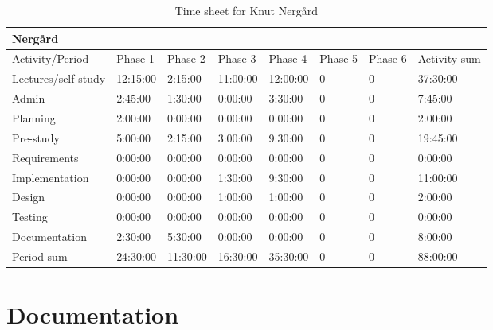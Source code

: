\documentclass[11pt]{book}
\begin{document}
\begin{table}[H]
\centering
\begin{tabular}{| l | l | l | l | l | l | l | l |}
    \hline
    Nergård             &             &             &             &             &             &             &                 \\ \hline         
    Activity/Period     & Phase 1     & Phase 2     & Phase  3    & Phase 4     & Phase 5     & Phase 6     & Activity sum    \\ \hline
    Lectures/self study & 12:15:00    & 2:15:00     & 11:00:00    & 12:00:00    & 0           & 0           & 37:30:00        \\ \hline
    Admin               & 2:45:00     & 1:30:00     & 0:00:00     & 3:30:00     & 0           & 0           & 7:45:00         \\ \hline
    Planning            & 2:00:00     & 0:00:00     & 0:00:00     & 0:00:00     & 0           & 0           & 2:00:00         \\ \hline
    Pre-study           & 5:00:00     & 2:15:00     & 3:00:00     & 9:30:00     & 0           & 0           & 19:45:00        \\ \hline
    Requirements        & 0:00:00     & 0:00:00     & 0:00:00     & 0:00:00     & 0           & 0           & 0:00:00         \\ \hline
    Implementation      & 0:00:00     & 0:00:00     & 1:30:00     & 9:30:00     & 0           & 0           & 11:00:00        \\ \hline
    Design              & 0:00:00     & 0:00:00     & 1:00:00     & 1:00:00     & 0           & 0           & 2:00:00         \\ \hline
    Testing             & 0:00:00     & 0:00:00     & 0:00:00     & 0:00:00     & 0           & 0           & 0:00:00         \\ \hline
    Documentation       & 2:30:00     & 5:30:00     & 0:00:00     & 0:00:00     & 0           & 0           & 8:00:00         \\ \hline
    Period sum          & 24:30:00    & 11:30:00    & 16:30:00    & 35:30:00    & 0           & 0           & 88:00:00        \\ \hline
\end{tabular}
\label{tab:appendix_timesheets_knut}
\caption{Time sheet for Knut Nergård}
\end{table}

\chapter{Documentation}\label{chap:documentation}
\end{document}
